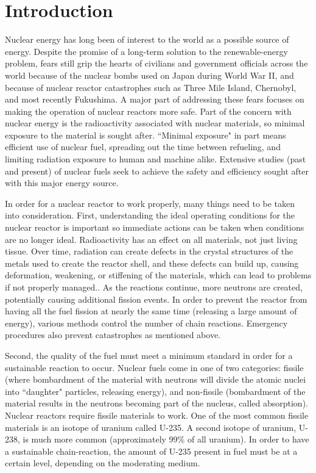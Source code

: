 \documentclass[12pt]{report}
\begin{document}
\chapter{Introduction\label{intro}}
Nuclear energy has long been of interest to the world as a possible source of energy.  Despite the promise of a long-term solution to the renewable-energy problem, fears still grip the hearts of civilians and government officials across the world because of the nuclear bombs used on Japan during World War II, and because of nuclear reactor catastrophes such as Three Mile Island, Chernobyl, and most recently Fukushima.  A major part of addressing these fears focuses on making the operation of nuclear reactors more safe.  Part of the concern with nuclear energy is the radioactivity associated with nuclear materials, so minimal exposure to the material is sought after.  ``Minimal exposure" in part means efficient use of nuclear fuel, spreading out the time between refueling, and limiting radiation exposure to human and machine alike.  Extensive studies (past and present) of nuclear fuels seek to achieve the safety and efficiency sought after with this major energy source.


In order for a nuclear reactor to work properly, many things need to be taken into consideration.  First, understanding the ideal operating conditions for the nuclear reactor is important so immediate actions can be taken when conditions are no longer ideal.  Radioactivity has an effect on all materials, not just living tissue.  Over time, radiation can create defects in the crystal structures of the metals used to create the reactor shell, and these defects can build up, causing deformation, weakening, or stiffening of the materials, which can lead to problems if not properly managed.\cite{callister2003}.  As the reactions continue, more neutrons are created, potentially causing additional fission events.  In order to prevent the reactor from having all the fuel fission at nearly the same time (releasing a large amount of energy), various methods control the number of chain reactions.  Emergency procedures also prevent catastrophes as mentioned above.

Second, the quality of the fuel must meet a minimum standard in order for a sustainable reaction to occur.  Nuclear fuels come in one of two categories: fissile (where bombardment of the material with neutrons will divide the atomic nuclei into ``daughter" particles, releasing energy), and non-fissile (bombardment of the material results in the neutrons becoming part of the nucleus, called absorption).  Nuclear reactors require fissile materials to work.  One of the most common fissile materials is an isotope of uranium called U-235.  A second isotope of uranium, U-238, is much more common (approximately 99\% of all uranium).  In order to have a sustainable chain-reaction, the amount of U-235 present in fuel must be at a certain level, depending on the moderating medium.\cite{uraniumInfo}
\end{document}
